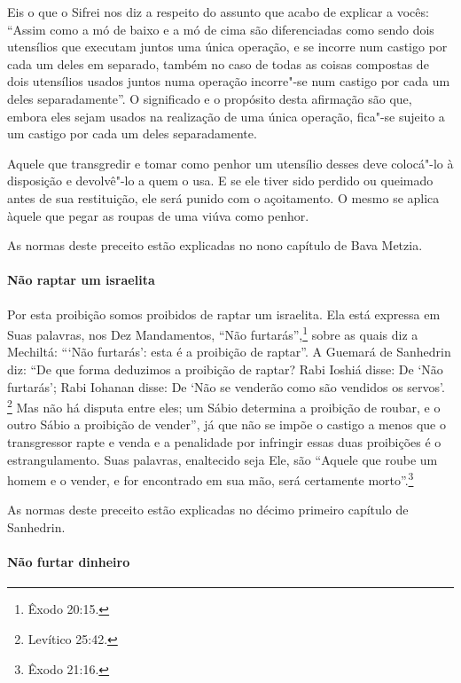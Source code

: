 \begin{multicols}{2}
Eis o que o Sifrei\starr{} nos diz a respeito do assunto que acabo de explicar
a vocês: ``Assim como a mó de baixo e a mó de cima são diferenciadas
como sendo dois utensílios que executam juntos uma única operação, e se
incorre num castigo por cada um deles em separado, também no caso de
todas as coisas compostas de dois utensílios usados juntos numa
operação incorre"-se num castigo por cada um deles separadamente''. O
significado e o propósito desta afirmação são que, embora eles sejam
usados na realização de uma única operação, fica"-se sujeito a um castigo
por cada um deles separadamente.

Aquele que transgredir e tomar como penhor um utensílio desses deve
colocá"-lo à disposição e devolvê"-lo a quem o usa. E se ele tiver sido
perdido ou queimado antes de sua restituição, ele será punido com o
açoitamento. O mesmo se aplica àquele que pegar as roupas de uma viúva
como penhor.

As normas deste preceito estão explicadas no nono capítulo de Bava Metzia\starr.

\paragraph{Não raptar um israelita}

Por esta proibição somos proibidos de raptar um israelita. Ela está
expressa em Suas palavras, nos Dez Mandamentos, ``Não furtarás'',\footnote{Êxodo
20:15.} sobre as quais diz a Mechiltá\starr: ```Não furtarás': esta é a
proibição de raptar''. A Guemará\starr{} de Sanhedrin\starr{} diz: ``De que forma
deduzimos a proibição de raptar? Rabi Ioshiá\starr{} disse: De `Não furtarás';
Rabi Iohanan\starr{} disse: De `Não se venderão como são vendidos os servos'. \footnote{Levítico 25:42.} Mas não há disputa entre eles; um Sábio determina a
proibição de roubar, e o outro Sábio a proibição de vender'', já que
não se impõe o castigo a menos que o transgressor rapte e venda
e a penalidade por infringir essas duas proibições é o estrangulamento.
Suas palavras, enaltecido seja Ele, são ``Aquele que roube um homem e
o vender, e for encontrado em sua mão, será certamente morto''.\footnote{Êxodo 21:16.}

As normas deste preceito estão explicadas no décimo primeiro capítulo de Sanhedrin\starr.
  

\paragraph{Não furtar dinheiro}


\end{multicols}
